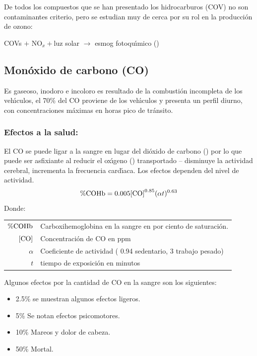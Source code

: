 De todos los compuestos que se han presentado los hidrocarburos (COV) no son contaminantes criterio, pero se estudian muy de cerca por su rol en la producci\'on de ozono:

\begin{center}
COVs $+$ NO$_x +$luz solar $\longrightarrow$ esmog fotoqu\'{\i}mico () 
\end{center}

\subsection{Mon\'oxido de carbono (CO)}
Es gaseoso, inodoro e incoloro es resultado de la combusti\'on incompleta de los veh\'{\i}culos, el 70\% del CO proviene de los veh\'{\i}culos y presenta un perfil diurno, con concentraciones m\'aximas en horas pico de tr\'ansito.

\subsubsection{Efectos a la salud:}
El CO se puede ligar a la sangre en lugar del di\'oxido de carbono () por lo que puede ser asfixiante al reducir el ox\'{\i}geno () transportado -- disminuye la actividad cerebral, incrementa la frecuencia card\'{\i}aca. Los efectos dependen del nivel de actividad.
\begin{equation}
\%\ce{COHb}  = 0.005[\ce{CO]}^{0.85}(\alpha t)^{0.63}
\end{equation}
Donde:

\begin{tabular}{r @{---}l}
$\%\ce{COHb} $ & Carboxihemoglobina en la sangre en por ciento de sa\-tu\-ra\-ci\'on.\\
$[\ce{CO}]$ &Concentraci\'on de CO en ppm\\
$\alpha$ & Coeficiente de actividad ( 0.94 sedentario, 3 trabajo pesado)\\
$t$ & tiempo de exposici\'on en minutos\\
\end{tabular}

Algunos efectos por la cantidad de CO en la sangre son los siguientes:
\begin{itemize}
\item 2.5\% se muestran algunos efectos ligeros.
\item 5\% Se notan efectos psicomotores.
\item 10\% Mareos y dolor de cabeza.
\item 50\% Mortal.
\end{itemize}

